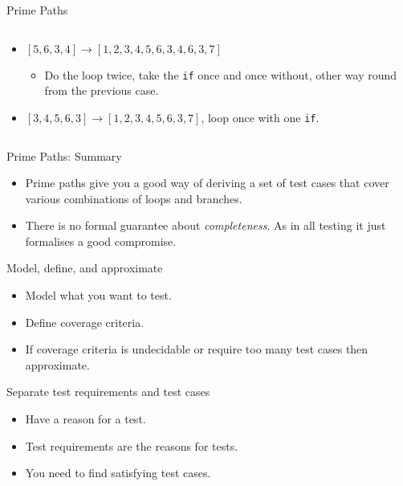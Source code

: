 \documentclass[handout]{beamer}
\begin{document}
\begin{frame}{Prime Paths}
\begin{columns}
\begin{column}{0.7\textwidth}
\begin{itemize}
\begin{itemize}
    \end{itemize}
  \item $[5,6,3,4] \rightarrow   [1,2,3,4,5,6,3,4,6,3,7]$
    \begin{itemize}
    \item Do the loop twice, take the {\tt if} once and once without,
      other way round from the previous case.
    \end{itemize}
  \item $[3,4,5,6,3] \rightarrow [1,2,3,4,5,6,3,7]$, loop once with
    one {\tt if}.
  \end{itemize}
\end{column}
\end{columns}
\end{frame}

\begin{frame}{Prime Paths: Summary}
  \begin{itemize}
  \item Prime paths give you a good way of deriving a set of test
    cases that cover various combinations of loops and branches.
  \item There is no formal guarantee about {\it completeness}. As in all
    testing it just formalises a good compromise. 
  \end{itemize}

\end{frame}
\begin{frame}{Model, define, and approximate}
  \begin{itemize}
  \item Model what you want to test.
  \item Define coverage criteria.
  \item If coverage criteria is undecidable or require too many test
    cases then approximate. 
  \end{itemize}
 \end{frame}
\begin{frame}{Separate test requirements and test cases}
  \begin{itemize}
  \item Have a reason for a test.
  \item Test requirements are the reasons for tests.
  \item You need to find satisfying test cases. 
  \end{itemize}
 
\end{frame}

\end{document}
